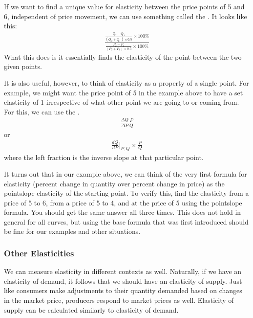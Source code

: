 \documentclass[letterpaper,10pt,english]{jupyterBook}
\begin{document}
\sphinxAtStartPar
If we want to find a unique value for elasticity between the price points of 5 and 6, independent of price movement, we can use something called the . It looks like this:
\begin{equation*}
\begin{split}\frac{\frac{Q_2 - Q_1}{(Q_2 + Q_1)\times0.5}\times100\%}{\frac{P_2 - P_1}{(P_2 + P_1)\times0.5}\times100\%}\end{split}
\end{equation*}
\sphinxAtStartPar
What this does is it essentially finds the elasticity of the point between the two given points.

\sphinxAtStartPar
It is also useful, however, to think of elasticity as a property of a single point. For example, we might want the price point of 5 in the example above to have a set elasticity of 1 irrespective of what other point we are going to or coming from. For this, we can use the .
\begin{equation*}
\begin{split}\frac{\Delta Q}{\Delta P}\frac{P}{Q}\end{split}
\end{equation*}
\sphinxAtStartPar
or
\begin{equation*}
\begin{split}\frac{dQ}{dP}\Bigr|_{P,Q}\times\frac{P}{Q}\end{split}
\end{equation*}
\sphinxAtStartPar
where the left fraction is the inverse slope at that particular point.

\sphinxAtStartPar
It turns out that in our example above, we can think of the very first formula for elasticity (percent change in quantity over percent change in price) as the point\sphinxhyphen{}slope elasticity of the starting point. To verify this, find the elasticity from a price of 5 to 6, from a price of 5 to 4, and at the price of 5 using the point\sphinxhyphen{}slope formula. You should get the same answer all three times. This does not hold in general for all curves, but using the base formula that was first introduced should be fine for our examples and other situations.


\subsubsection{Other Elasticities}
\label{\detokenize{content/01-demand/04-elasticity:other-elasticities}}
\sphinxAtStartPar
We can measure elasticity in different contexts as well. Naturally, if we have an elasticity of demand, it follows that we should have an elasticity of supply. Just like consumers make adjustments to their quantity demanded based on changes in the market price, producers respond to market prices as well. Elasticity of supply can be calculated similarly to elasticity of demand.
\end{document}
